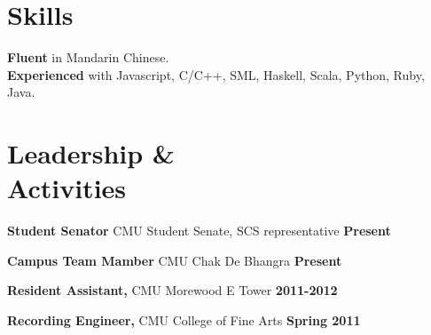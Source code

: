 \documentclass[sectioned]{dsyangres}
\begin{document}
\begin{resume}


\section{Skills}
\textbf{Fluent} in Mandarin Chinese. \\
\textbf{Experienced} with Javascript, C/C++, SML, Haskell, Scala, Python, Ruby, Java.

\section{Leadership \& \\ Activities}

\textbf{Student Senator} CMU Student Senate, SCS representative \hfill \textbf{Present}

\textbf{Campus Team Mamber} CMU Chak De Bhangra  \hfill \textbf{Present}

\textbf{Resident Assistant,} CMU Morewood E Tower \hfill \textbf{2011-2012}

 \textbf{Recording Engineer,} CMU College of Fine Arts \hfill
 \textbf{ Spring 2011}

\end{resume}
\end{document}
